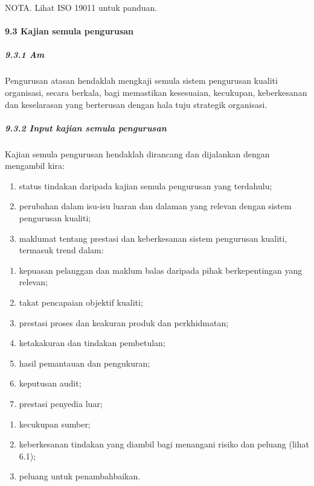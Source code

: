 \documentclass[
]{article}
\begin{document}
NOTA. Lihat ISO 19011 untuk panduan.

\hypertarget{kajian-semula-pengurusan}{%
\paragraph{9.3 Kajian semula
pengurusan}\label{kajian-semula-pengurusan}}

\hypertarget{am-8}{%
\subparagraph{9.3.1 Am}\label{am-8}}

Pengurusan atasan hendaklah mengkaji semula sistem pengurusan kualiti
organisasi, secara berkala, bagi memastikan kesesuaian, kecukupan,
keberkesanan dan keselarasan yang berterusan dengan hala tuju strategik
organisasi.

\hypertarget{input-kajian-semula-pengurusan}{%
\subparagraph{9.3.2 Input kajian semula
pengurusan}\label{input-kajian-semula-pengurusan}}

Kajian semula pengurusan hendaklah dirancang dan dijalankan dengan
mengambil kira:

\begin{enumerate}
\def\labelenumi{\alph{enumi})}
\item
  status tindakan daripada kajian semula pengurusan yang terdahulu;
\item
  perubahan dalam isu-isu luaran dan dalaman yang relevan dengan sistem
  pengurusan kualiti;
\item
  maklumat tentang prestasi dan keberkesanan sistem pengurusan kualiti,
  termasuk trend dalam:
\end{enumerate}

\begin{enumerate}
\def\labelenumi{\arabic{enumi})}
\item
  kepuasan pelanggan dan maklum balas daripada pihak berkepentingan yang
  relevan;
\item
  takat pencapaian objektif kualiti;
\item
  prestasi proses dan keakuran produk dan perkhidmatan;
\item
  ketakakuran dan tindakan pembetulan;
\item
  hasil pemantauan dan pengukuran;
\item
  keputusan audit;
\item
  prestasi penyedia luar;
\end{enumerate}

\begin{enumerate}
\def\labelenumi{\alph{enumi})}
\setcounter{enumi}{3}
\item
  kecukupan sumber;
\item
  keberkesanan tindakan yang diambil bagi menangani risiko dan peluang
  (lihat 6.1);
\item
  peluang untuk penambahbaikan.
\end{enumerate}
\end{document}
